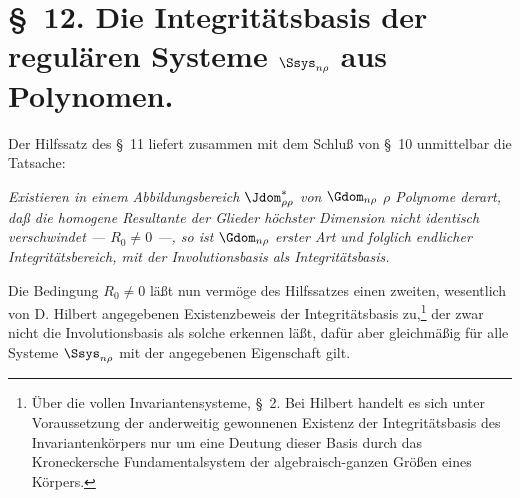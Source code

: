 \documentclass[11pt]{article}
\begin{document}
\section*{\S\ 12. Die Integritätsbasis der regulären Systeme $\Ssys_{n\rho}$ aus Polynomen.}

Der Hilfssatz des \S\ 11 liefert zusammen mit dem Schluß von \S\ 10 unmittelbar die Tatsache:

\emph{Existieren in einem Abbildungsbereich $\Jdom^*_{\rho\rho}$ von $\Gdom_{n\rho}$ $\rho$ Polynome derart, daß die homogene Resultante der Glieder höchster Dimension nicht identisch verschwindet --- $R_0\ne0$ ---, so ist $\Gdom_{n\rho}$ erster Art und folglich endlicher Integritätsbereich, mit der Involutionsbasis als Integritätsbasis.}

Die Bedingung $R_0\ne0$ läßt nun vermöge des Hilfssatzes einen zweiten, wesentlich von D. Hilbert angegebenen Existenzbeweis der Integritätsbasis zu,\footnote{Über die vollen Invariantensysteme, \S\ 2. Bei Hilbert handelt es sich unter Voraussetzung der anderweitig gewonnenen Existenz der Integritätsbasis des Invariantenkörpers nur um eine Deutung dieser Basis durch das Kroneckersche Fundamentalsystem der algebraisch-ganzen Größen eines Körpers.} der zwar nicht die Involutionsbasis als solche erkennen läßt, dafür aber gleichmäßig für alle Systeme $\Ssys_{n\rho}$ mit der angegebenen Eigenschaft gilt.
\end{document}
